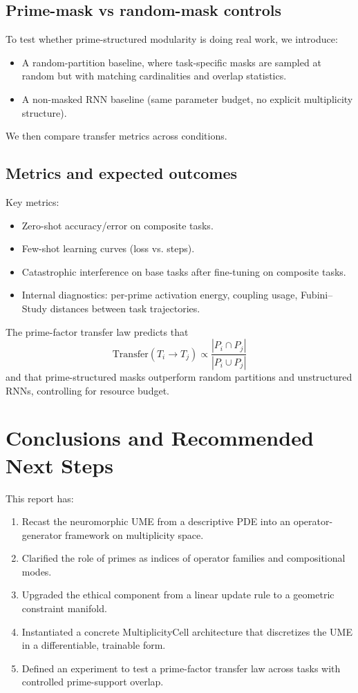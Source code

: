 \documentclass[11pt]{article}
\begin{document}
\subsection{Prime-mask vs random-mask controls}

To test whether prime-structured modularity is doing real work, we introduce:
\begin{itemize}[nosep]
\item A random-partition baseline, where task-specific masks are sampled at random but with matching cardinalities and overlap statistics.
\item A non-masked RNN baseline (same parameter budget, no explicit multiplicity structure).
\end{itemize}

We then compare transfer metrics across conditions.

\subsection{Metrics and expected outcomes}

Key metrics:
\begin{itemize}[nosep]
\item Zero-shot accuracy/error on composite tasks.
\item Few-shot learning curves (loss vs. steps).
\item Catastrophic interference on base tasks after fine-tuning on composite tasks.
\item Internal diagnostics: per-prime activation energy, coupling usage, Fubini--Study distances between task trajectories.
\end{itemize}

The prime-factor transfer law predicts that
\begin{equation}
\mathrm{Transfer}(T_i\to T_j)
\propto \frac{|P_i\cap P_j|}{|P_i\cup P_j|}
\end{equation}
and that prime-structured masks outperform random partitions and unstructured RNNs, controlling for resource budget.

\section{Conclusions and Recommended Next Steps}

This report has:
\begin{enumerate}[nosep]
\item Recast the neuromorphic UME from a descriptive PDE into an operator-generator framework on multiplicity space.
\item Clarified the role of primes as indices of operator families and compositional modes.
\item Upgraded the ethical component from a linear update rule to a geometric constraint manifold.
\item Instantiated a concrete MultiplicityCell architecture that discretizes the UME in a differentiable, trainable form.
\item Defined an experiment to test a prime-factor transfer law across tasks with controlled prime-support overlap.
\end{enumerate}
\end{document}
